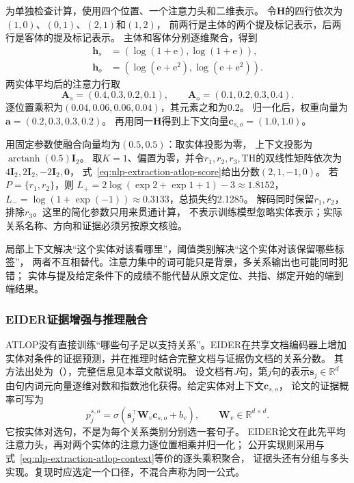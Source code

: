 \begin{example}[从局部上下文到多关系输出]
\label{ex:nlp-extraction-atlop}
为单独检查计算，使用四个位置、一个注意力头和二维表示。
令$\bm{H}$的四行依次为$(1,0)$、$(0,1)$、$(2,1)$和$(1,2)$，
前两行是主体的两个提及标记表示，后两行是客体的提及标记表示。
主体和客体分别逐维聚合，得到
\[
  \begin{aligned}
    \bm{h}_s&=(\log(1+\mathrm{e}),\log(1+\mathrm{e})),\\
    \bm{h}_o&=(\log(\mathrm{e}+\mathrm{e}^{2}),
                \log(\mathrm{e}+\mathrm{e}^{2})).
  \end{aligned}
\]
两实体平均后的注意力行取
\[
  \bm{A}_s=(0.4,0.3,0.2,0.1),\qquad
  \bm{A}_o=(0.1,0.2,0.3,0.4).
\]
逐位置乘积为$(0.04,0.06,0.06,0.04)$，其元素之和为0.2。
归一化后，权重向量为$\bm{a}=(0.2,0.3,0.3,0.2)$。
再用同一$\bm{H}$得到上下文向量$\bm{c}_{s,o}=(1.0,1.0)$。

用固定参数使融合向量均为$(0.5,0.5)$：取实体投影为零，
上下文投影为$\operatorname{arctanh}(0.5)\bm{I}_2$。
取$K=1$、偏置为零，并令$r_1,r_2,r_3,\mathrm{TH}$的双线性矩阵依次为
$4\bm{I}_2,2\bm{I}_2,-2\bm{I}_2,\bm{0}$，
式~\eqref{eq:nlp-extraction-atlop-score}给出分数$(2,1,-1,0)$。
若$P=\{r_1,r_2\}$，则
$L_+=2\log(\exp2+\exp1+1)-3\approx1.8152$，
$L_-=\log(1+\exp(-1))\approx0.3133$，总损失约2.1285。
解码同时保留$r_1,r_2$，排除$r_3$。这里的简化参数只用来贯通计算，
不表示训练模型忽略实体表示；实际关系名称、方向和证据必须另按原文核验。
\end{example}

局部上下文解决“这个实体对该看哪里”，阈值类别解决“这个实体对该保留哪些标签”，
两者不互相替代。注意力集中的词可能只是背景，多关系输出也可能同时犯错；
实体与提及给定条件下的成绩不能代替从原文定位、共指、绑定开始的端到端结果。

\subsubsection{EIDER证据增强与推理融合}
\label{sec:nlp-extraction-eider}

ATLOP没有直接训练“哪些句子足以支持关系”。EIDER在共享文档编码器上增加
实体对条件的证据预测，并在推理时结合完整文档与证据伪文档的关系分数。
其方法出处为\citeauthor{xie2022eider}（\citeyear{xie2022eider}），完整信息见本章文献说明。
设文档有$J$句，第$j$句的表示$\bm{s}_j\in\mathbb{R}^{d}$
由句内词元向量逐维对数和指数池化获得。给定实体对上下文$\bm{c}_{s,o}$，
论文的证据概率可写为
\begin{equation}
  p_j^{s,o}=\sigma(\bm{s}_j^\top\bm{W}_v\bm{c}_{s,o}+b_v),
  \qquad \bm{W}_v\in\mathbb{R}^{d\times d}.
  \label{eq:nlp-extraction-eider-evidence}
\end{equation}
它按实体对选句，不是为每个关系类别分别选一套句子。
EIDER论文在此先平均注意力头，再对两个实体的注意力逐位置相乘并归一化；
公开实现则采用与式~\eqref{eq:nlp-extraction-atlop-context}等价的逐头乘积聚合，
证据头还有分组与多头实现。复现时应选定一个口径，不混合声称为同一公式。

